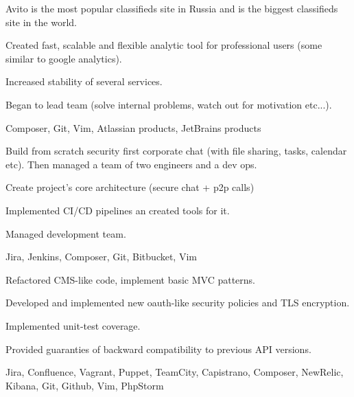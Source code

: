 \documentclass{cv}
\begin{document}
    Avito is the most popular classifieds site in Russia and is the biggest
    classifieds site in the world.
    \begin{gaas}
      \item Created fast, scalable and flexible analytic tool for professional
        users (some similar to google analytics).
      \item Increased stability of several services.
      \item Began to lead team (solve internal problems, watch out for
        motivation etc...).
    \end{gaas}
    \devtools
      Composer, Git, Vim, Atlassian products, JetBrains products

    Build from scratch security first corporate chat (with file sharing,
    tasks, calendar etc). Then managed a team of two engineers and a dev ops.
    \begin{gaas}
      \item Create project's core architecture (secure chat + p2p calls)
      \item Implemented CI/CD pipelines an created tools for it.
      \item Managed development team.
    \end{gaas}
    \devtools
      Jira, Jenkins, Composer, Git, Bitbucket, Vim

    \begin{gaas}
      \item Refactored CMS-like code, implement basic MVC patterns.
      \item Developed and implemented new oauth-like security policies and
        TLS encryption.
      \item Implemented unit-test coverage.
      \item Provided guaranties of backward compatibility to previous API
        versions.
    \end{gaas}
    \devtools
      Jira, Confluence, Vagrant, Puppet, TeamCity, Capistrano, Composer,
      NewRelic, Kibana, Git, Github, Vim, PhpStorm
\end{document}
